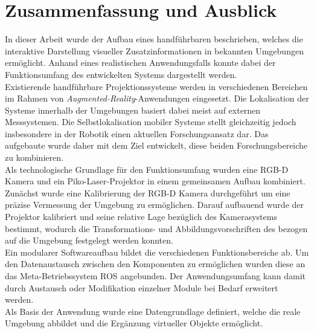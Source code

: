 \chapter{Zusammenfassung und Ausblick}
\label{chap.zusammenfassung}

In dieser Arbeit wurde der Aufbau eines handführbaren \kps{} beschrieben, welches die interaktive Darstellung visueller Zusatzinformationen in bekannten Umgebungen ermöglicht. Anhand eines realistischen Anwendungsfalls konnte dabei der Funktionsumfang des entwickelten Systems dargestellt werden.\\
Existierende handführbare Projektionssysteme werden in verschiedenen Bereichen im Rahmen von \textit{Augmented-Reality}-Anwendungen eingesetzt. Die Lokalisation der Systeme innerhalb der Umgebungen basiert dabei meist auf externen Messsystemen. Die Selbstlokalisation mobiler Systeme stellt gleichzeitig jedoch insbesondere in der Robotik einen aktuellen Forschungsansatz dar. Das aufgebaute \kps{} wurde daher mit dem Ziel entwickelt, diese beiden Forschungsbereiche zu kombinieren.\\

Als technologische Grundlage für den Funktionsumfang wurden eine RGB-D Kamera und ein Piko-Laser-Projektor in einem gemeinsamen Aufbau kombiniert. Zunächst wurde eine Kalibrierung der RGB-D Kamera durchgeführt um eine präzise Vermessung der Umgebung zu ermöglichen. Darauf aufbauend wurde der Projektor kalibriert und seine relative Lage bezüglich des Kamerasystems bestimmt, wodurch die Transformations- und Abbildungsvorschriften des  bezogen auf die Umgebung festgelegt werden konnten.\\

Ein modularer Softwareaufbau bildet die verschiedenen Funktionsbereiche ab. Um den Datenaustausch zwischen den Komponenten zu ermöglichen wurden diese an das Meta-Betriebssystem ROS angebunden. Der Anwendungsumfang kann damit durch Austausch oder Modifikation einzelner Module bei Bedarf erweitert werden.\\
Als Basis der Anwendung wurde eine Datengrundlage definiert, welche die reale Umgebung abbildet und die Ergänzung virtueller Objekte ermöglicht. \\
 

